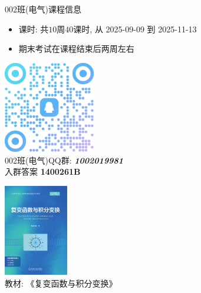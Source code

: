 \begin{frame}[<*>]{002班(电气)课程信息}
	\begin{itemize}
		\item 课时: 共$10$周$40$课时, 从 2025-09-09 到 2025-11-13
		\item 期末考试在课程结束后两周左右
	\end{itemize}
	\begin{twopart}{180pt}
		\begin{center}
			\includegraphics[height=40mm]{../image/002.png}\\
			002班(电气)QQ群: \emph{\textbf{1002019981}}\\
			入群答案 \alert{\textbf{1400261B}}
		\end{center}
		\tcblower
		\begin{center}
			\includegraphics[height=40mm]{../image/book.png}\\
			教材: 《复变函数与积分变换》
		\end{center}
	\end{twopart}
\end{frame}


